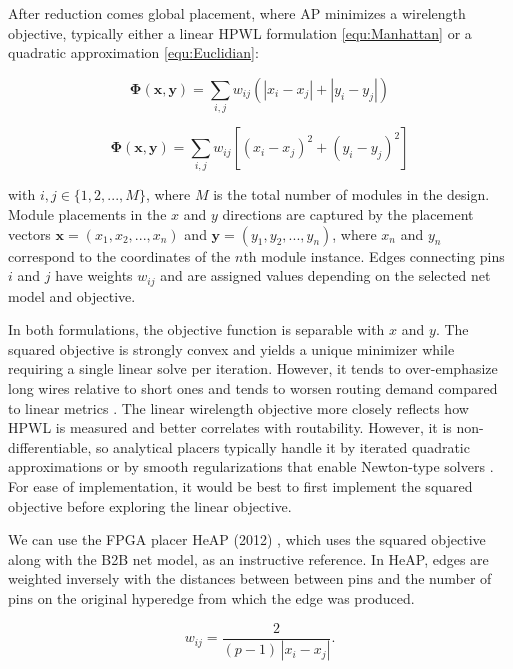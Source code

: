 After reduction comes global placement, where AP minimizes a wirelength objective, typically either a linear HPWL formulation \eqref{equ:Manhattan} or a quadratic approximation \eqref{equ:Euclidian}:


\begin{equation}
    \boldsymbol{\Phi} (\boldsymbol{x}, \boldsymbol{y}) = \sum_{i,j} w_{ij} \left( |x_i - x_j| + |y_i - y_j| \right)
    \label{equ:Manhattan}
\end{equation}

\begin{equation}
    \boldsymbol{\Phi} (\boldsymbol{x}, \boldsymbol{y}) = \sum_{i,j} w_{ij} \left[ (x_i - x_j)^2 + (y_i - y_j)^2 \right]
    \label{equ:Euclidian}
\end{equation}

with $i, j \in \{1, 2, ..., M\}$, where $M$ is the total number of modules in the design.
Module placements in the $x$ and $y$ directions are captured by the placement vectors \( \boldsymbol{x} = (x_1, x_2, ..., x_n) \) and \( \boldsymbol{y} = (y_1, y_2, ..., y_n) \), where $x_n$ and $y_n$ correspond to the coordinates of the $n$th module instance.
Edges connecting pins $i$ and $j$ have weights $w_{ij}$ and are assigned values depending on the selected net model and objective.

In both formulations, the objective function is separable with $x$ and $y$.
The squared objective is strongly convex and yields a unique minimizer while requiring a single linear solve per iteration. 
However, it tends to over-emphasize long wires relative to short ones and tends to worsen routing demand compared to linear metrics \cite{AP_2000}. 
The linear wirelength objective more closely reflects how HPWL is measured and better correlates with routability. 
However, it is non-differentiable, so analytical placers typically handle it by iterated quadratic approximations or by smooth regularizations that enable Newton-type solvers \cite{AP_2000}. 
For ease of implementation, it would be best to first implement the squared objective before exploring the linear objective.

We can use the FPGA placer HeAP (2012) \cite{AP_2012}, which uses the squared objective along with the B2B net model, as an instructive reference.
In HeAP, edges are weighted inversely with the distances between between pins and the number of pins on the original hyperedge from which the edge was produced.

\begin{equation}
    w_{ij} = \frac{2}{(p-1)\,|x_i - x_j|}.
    \label{equ:weight_linearized}
\end{equation}


